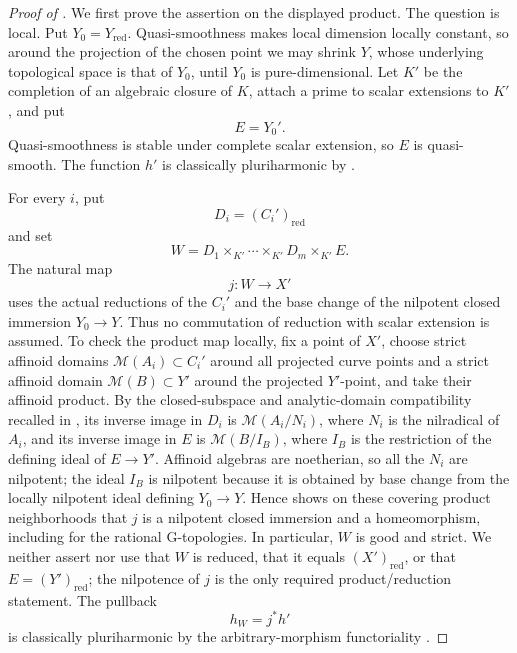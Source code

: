 \begin{proof}[Proof of
]
We first prove the assertion on the displayed product.  The question is
local.  Put \(Y_0=Y_{\mathrm{red}}\).  Quasi-smoothness makes local
dimension locally constant, so around the projection of the chosen point
we may shrink \(Y\), whose underlying topological space is that of \(Y_0\),
until \(Y_0\) is pure-dimensional.  Let \(K'\) be the completion of an
algebraic closure of \(K\), attach a prime to scalar extensions to \(K'\),
and put
\[
                              E=Y_0'.
\]
Quasi-smoothness is stable under complete scalar extension, so \(E\) is
quasi-smooth.  The function \(h'\) is classically pluriharmonic by
\cite[Proposition~7.2(6)]{GR25Classical}.

For every \(i\), put
\[
                         D_i=(C_i')_{\mathrm{red}}
\]
and set
\[
             W=D_1\times_{K'}\cdots\times_{K'}D_m\times_{K'}E.
\]
The natural map
\[
                              j:W\longrightarrow X'
\]
uses the actual reductions of the \(C_i'\) and the base change of the
nilpotent closed immersion \(Y_0\to Y\).  Thus no commutation of reduction
with scalar extension is assumed.  To check the product map locally, fix a
point of \(X'\), choose strict affinoid domains
\(\mathcal M(A_i)\subset C_i'\) around all projected curve points and a
strict affinoid domain \(\mathcal M(B)\subset Y'\) around the projected
\(Y'\)-point, and take their affinoid product.  By the closed-subspace and
analytic-domain compatibility recalled in \cite[\S11.2.2]{CLD25}, its
inverse image in \(D_i\) is
\(\mathcal M(A_i/N_i)\), where \(N_i\) is the nilradical of \(A_i\), and
its inverse image in \(E\) is \(\mathcal M(B/I_B)\), where \(I_B\) is the
restriction of the defining ideal of \(E\to Y'\).  Affinoid algebras are
noetherian, so all the \(N_i\) are nilpotent; the ideal \(I_B\) is
nilpotent because it is obtained by base change from the locally nilpotent
ideal defining \(Y_0\to Y\).  Hence
 shows on these covering product
neighborhoods that \(j\) is a nilpotent closed immersion and a
homeomorphism, including for the rational G-topologies.  In particular,
\(W\) is good and strict.  We neither assert nor use that \(W\) is reduced,
that it equals \((X')_{\mathrm{red}}\), or that \(E=(Y')_{\mathrm{red}}\);
the nilpotence of \(j\) is the only required product/reduction statement.
The pullback
\[
                              h_W=j^*h'
\]
is classically pluriharmonic by the arbitrary-morphism functoriality
\cite[Proposition~7.2(7)]{GR25Classical}.


\end{proof}
